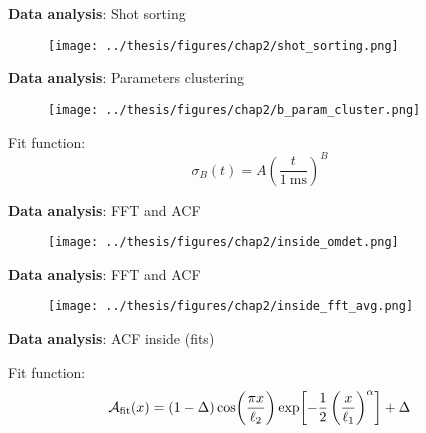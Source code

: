 \documentclass[aspectratio=169]{beamer}
\begin{document}
\begin{frame}{\textbf{Data analysis}: Shot sorting}
  \begin{figure}
      \centering
      \texttt{[image: ../thesis/figures/chap2/shot\_sorting.png]}
  \end{figure}
\end{frame}

\begin{frame}{\textbf{Data analysis}: Parameters clustering}
  \begin{minipage}{0.70\textwidth}
    \begin{figure}
        \centering
        \texttt{[image: ../thesis/figures/chap2/b\_param\_cluster.png]}
    \end{figure}
  \end{minipage}
  \hspace{0.01\textwidth}
  \begin{minipage}{0.27\textwidth}
    Fit function:
    \[
      \sigma_B(t) = A\left(\frac{t}{1\ \unit{\milli\second}}\right)^B
    \]  
  \end{minipage}
\end{frame}

\begin{frame}{\textbf{Data analysis}: FFT and ACF}
  \begin{figure}
      \centering
      \texttt{[image: ../thesis/figures/chap2/inside\_omdet.png]}
  \end{figure}
\end{frame}

\begin{frame}{\textbf{Data analysis}: FFT and ACF}
  \begin{figure}
      \centering
      \texttt{[image: ../thesis/figures/chap2/inside\_fft\_avg.png]}
  \end{figure}
\end{frame}

\begin{frame}{\textbf{Data analysis}: ACF inside (fits)}
  \hspace{-0.05\textwidth}
  \begin{minipage}{0.47 \textwidth}
    \centering
  \end{minipage}
  \hspace{0.01\textwidth}
  \begin{minipage}{0.50 \textwidth}
      Fit function:
      \[
        \mathcal{A}_{\rm fit}(x) = (1 - \Delta)\cos(\frac{\pi x}{\ell_2})\exp[-\frac{1}{2}\left(\frac{x}{\ell_1}\right)^\alpha] + \Delta
      \]
  \end{minipage}
\end{frame}
\end{document}
